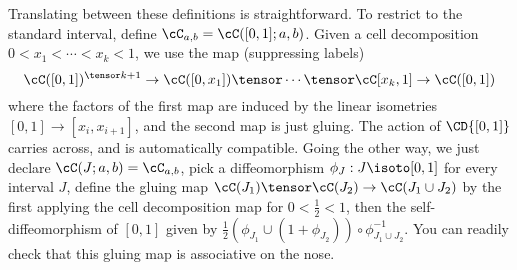 Translating between these definitions is straightforward. To restrict to the standard interval, define $\cC_{a,b} = \cC([0,1];a,b)$. Given a cell decomposition $0 < x_1< \cdots < x_k < 1$, we use the map (suppressing labels)
$$\cC([0,1])^{\tensor k+1} \to \cC([0,x_1]) \tensor \cdots \tensor \cC[x_k,1] \to \cC([0,1])$$
where the factors of the first map are induced by the linear isometries $[0,1] \to [x_i, x_{i+1}]$, and the second map is just gluing. The action of $\CD{[0,1]}$ carries across, and is automatically compatible. Going the other way, we just declare $\cC(J;a,b) = \cC_{a,b}$, pick a diffeomorphism $\phi_J : J \isoto [0,1]$ for every interval $J$, define the gluing map $\cC(J_1) \tensor \cC(J_2) \to \cC(J_1 \cup J_2)$ by the first applying the cell decomposition map for $0 < \frac{1}{2} < 1$, then the self-diffeomorphism of $[0,1]$ given by $\frac{1}{2} (\phi_{J_1} \cup (1+ \phi_{J_2})) \circ \phi_{J_1 \cup J_2}^{-1}$. You can readily check that this gluing map is associative on the nose. 




